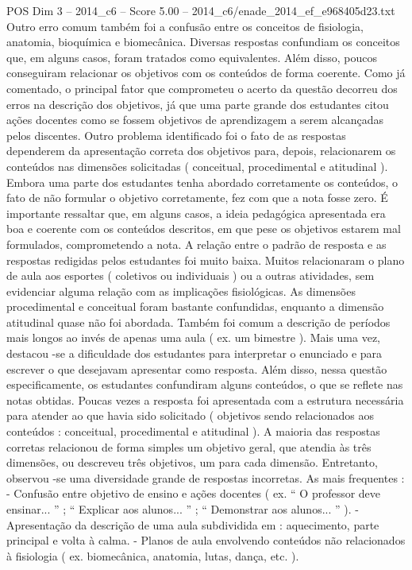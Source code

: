 \begin{textsample}{POS Dim 3 – 2014\_c6 – Score 5.00 – 2014\_c6/enade\_2014\_ef\_e968405d23.txt}
Outro erro comum também foi a confusão entre os conceitos de fisiologia, anatomia, bioquímica e biomecânica.
Diversas respostas confundiam os conceitos que, em alguns casos, foram tratados como equivalentes.
Além disso, poucos conseguiram relacionar os objetivos com os conteúdos de forma coerente.
Como já comentado, o principal fator que comprometeu o acerto da questão decorreu dos erros na descrição dos objetivos, já que uma parte grande dos estudantes citou ações docentes como se fossem objetivos de aprendizagem a serem alcançadas pelos discentes.
Outro problema identificado foi o fato de as respostas dependerem da apresentação correta dos objetivos para, depois, relacionarem os conteúdos nas dimensões solicitadas ( conceitual, procedimental e atitudinal ).
Embora uma parte dos estudantes tenha abordado corretamente os conteúdos, o fato de não formular o objetivo corretamente, fez com que a nota fosse zero.
É importante ressaltar que, em alguns casos, a ideia pedagógica apresentada era boa e coerente com os conteúdos descritos, em que pese os objetivos estarem mal formulados, comprometendo a nota.
A relação entre o padrão de resposta e as respostas redigidas pelos estudantes foi muito baixa.
Muitos relacionaram o plano de aula aos esportes ( coletivos ou individuais ) ou a outras atividades, sem evidenciar alguma relação com as implicações fisiológicas.
As dimensões procedimental e conceitual foram bastante confundidas, enquanto a dimensão atitudinal quase não foi abordada.
Também foi comum a descrição de períodos mais longos ao invés de apenas uma aula ( ex. um bimestre ).
Mais uma vez, destacou -se a dificuldade dos estudantes para interpretar o enunciado e para escrever o que desejavam apresentar como resposta.
Além disso, nessa questão especificamente, os estudantes confundiram alguns conteúdos, o que se reflete nas notas obtidas.
Poucas vezes a resposta foi apresentada com a estrutura necessária para atender ao que havia sido solicitado ( objetivos sendo relacionados aos conteúdos : conceitual, procedimental e atitudinal ).
A maioria das respostas corretas relacionou de forma simples um objetivo geral, que atendia às três dimensões, ou descreveu três objetivos, um para cada dimensão.
Entretanto, observou -se uma diversidade grande de respostas incorretas.
As mais frequentes : - Confusão entre objetivo de ensino e ações docentes ( ex. “ O professor deve ensinar... ” ; “ Explicar aos alunos... ” ; “ Demonstrar aos alunos... ” ). - Apresentação da descrição de uma aula subdividida em : aquecimento, parte principal e volta à calma. - Planos de aula envolvendo conteúdos não relacionados à fisiologia ( ex. biomecânica, anatomia, lutas, dança, etc. ).

\end{textsample}
